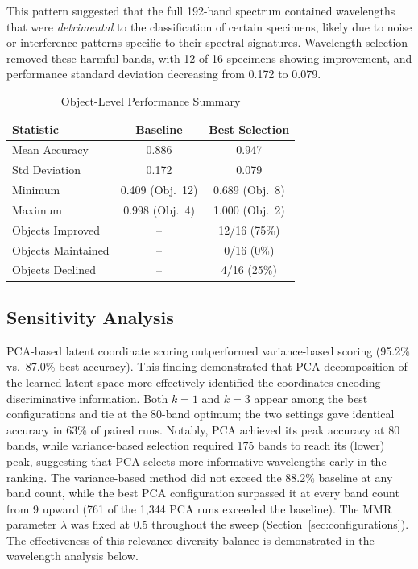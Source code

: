 This pattern suggested that the full 192-band spectrum contained wavelengths that were \emph{detrimental} to the classification of certain specimens, likely due to noise or interference patterns specific to their spectral signatures.
Wavelength selection removed these harmful bands, with 12 of 16 specimens showing improvement, and performance standard deviation decreasing from 0.172 to 0.079.


\begin{table}[!t]
\centering
\caption{Object-Level Performance Summary}
\label{tab:objects}
\begin{tabular}{@{}lcc@{}}
\toprule
\textbf{Statistic} & \textbf{Baseline} & \textbf{Best Selection} \\
\midrule
Mean Accuracy & 0.886 & 0.947 \\
Std Deviation & 0.172 & 0.079 \\
Minimum & 0.409 (Obj.\ 12) & 0.689 (Obj.\ 8) \\
Maximum & 0.998 (Obj.\ 4) & 1.000 (Obj.\ 2) \\
\midrule
Objects Improved & -- & 12/16 (75\%) \\
Objects Maintained & -- & 0/16 (0\%) \\
Objects Declined & -- & 4/16 (25\%) \\
\bottomrule
\end{tabular}
\end{table}


\subsection{Sensitivity Analysis}
\label{sec:results_params}


PCA-based latent coordinate scoring outperformed variance-based scoring (95.2\% vs.\ 87.0\% best accuracy).
This finding demonstrated that PCA decomposition of the learned latent space more effectively identified the coordinates encoding discriminative information.
Both $k = 1$ and $k = 3$ appear among the best configurations and tie at the 80-band optimum; the two settings gave identical accuracy in 63\% of paired runs.
Notably, PCA achieved its peak accuracy at 80 bands, while variance-based selection required 175 bands to reach its (lower) peak, suggesting that PCA selects more informative wavelengths early in the ranking.
The variance-based method did not exceed the 88.2\% baseline at any band count, while the best PCA configuration surpassed it at every band count from 9 upward (761 of the 1,344 PCA runs exceeded the baseline).
The MMR parameter $\lambda$ was fixed at 0.5 throughout the sweep (Section~\ref{sec:configurations}).
The effectiveness of this relevance-diversity balance is demonstrated in the wavelength analysis below.

